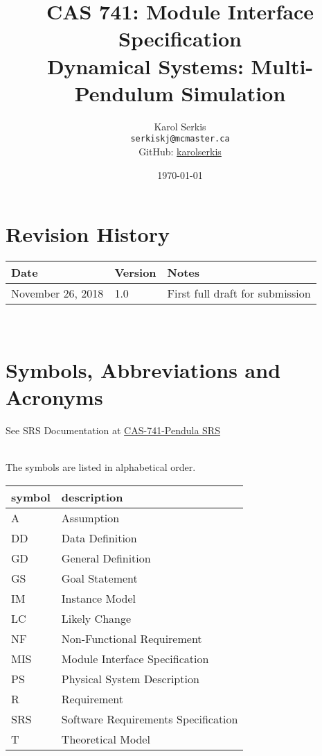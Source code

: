 \documentclass[12pt, titlepage]{article}
\newcommand{\progname}{Multi-Pendulum Simulation }
\begin{document}
\title{CAS 741: Module Interface Specification\\[10pt]\Large Dynamical Systems: \progname}
\author{Karol Serkis\\\texttt{serkiskj@mcmaster.ca}\\GitHub:
\href{https://www.github.com/karolserkis}{karolserkis}}
\date{\today}

\maketitle


\section{Revision History}

\begin{tabularx}{\textwidth}{p{4cm}p{2cm}X}
\toprule {\bf Date} & {\bf Version} & {\bf Notes}\\
\midrule
November 26, 2018 & 1.0 &  First full draft for submission\\
\bottomrule
\end{tabularx}

~\newpage

\section{Symbols, Abbreviations and Acronyms}

See SRS Documentation at 
\href{https://github.com/karolserkis/CAS-741-Pendula/blob/master/docs/SRS/SRS.pdf}{CAS-741-Pendula SRS}

\\
The symbols are listed in alphabetical order.\\

\renewcommand{\arraystretch}{1.2}
\begin{tabular}{l l} 
  \toprule		
  \textbf{symbol} & \textbf{description}\\
  \midrule 
  A & Assumption\\
  DD & Data Definition\\
  GD & General Definition\\
  GS & Goal Statement\\
  IM & Instance Model\\
  LC & Likely Change\\
  NF & Non-Functional Requirement\\
  MIS & Module Interface Specification\\
  PS & Physical System Description\\
  R & Requirement\\
  SRS & Software Requirements Specification\\
  T & Theoretical Model\\
  \bottomrule
\end{tabular}\\
\end{document}
